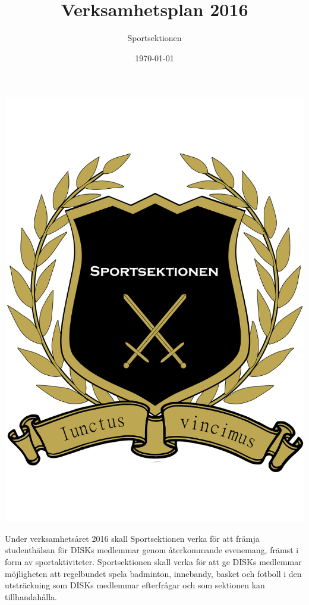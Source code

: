 \documentclass[12pt,a4paper]{article}
\begin{document}
	\title{\Huge Verksamhetsplan 2016}
	\author{Sportsektionen}
	\date{\today}

	\maketitle


	\begin{center}
		\includegraphics[scale=0.1]{../../Images/logo/logo}
	\end{center}


	\null
	\vfill

	\clearpage

	Under verksamhetsåret 2016 skall Sportsektionen verka för att främja studenthälsan för DISKs medlemmar genom återkommande evenemang, främst i form av sportaktiviteter.
	Sportsektionen skall verka för att ge DISKs medlemmar möjligheten att regelbundet spela badminton, innebandy, basket och fotboll i den utsträckning som DISKs medlemmar efterfrågar och som sektionen kan tillhandahålla.
\end{document}
